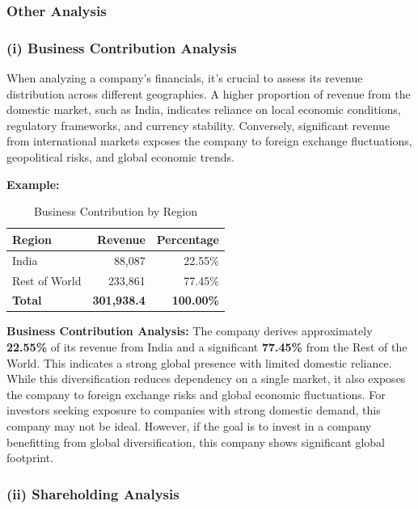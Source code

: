 \documentclass[12pt]{article}
\begin{document}
\subsubsection{Other Analysis}

\subsubsection*{(i) Business Contribution Analysis}

When analyzing a company's financials, it's crucial to assess its revenue distribution across different geographies.
A higher proportion of revenue from the domestic market, such as India, indicates reliance on local economic conditions, regulatory frameworks, and currency stability. Conversely, significant revenue from international markets exposes the company to foreign exchange fluctuations, geopolitical risks, and global economic trends.

\textbf{Example:}
\begin{table}[h!]
\centering
\begin{tabular}{|l|r|r|}
\hline
\textbf{Region} & \textbf{Revenue} & \textbf{Percentage} \\
\hline
India & 88,087 & 22.55\% \\
Rest of World & 233,861 & 77.45\% \\
\hline
\textbf{Total} & \textbf{301,938.4} & \textbf{100.00\%} \\
\hline
\end{tabular}
\caption{Business Contribution by Region}
\end{table}

\textbf{Business Contribution Analysis:} The company derives approximately \textbf{22.55\%} of its revenue from India and a significant \textbf{77.45\%} from the Rest of the World. This indicates a strong global presence with limited domestic reliance. While this diversification reduces dependency on a single market, it also exposes the company to foreign exchange risks and global economic fluctuations. For investors seeking exposure to companies with strong domestic demand, this company may not be ideal. However, if the goal is to invest in a company benefitting from global diversification, this company shows significant global footprint.

\subsubsection*{(ii) Shareholding Analysis}
\end{document}
